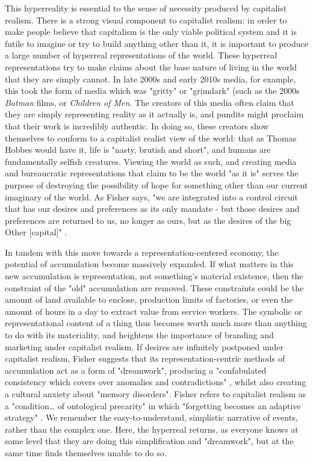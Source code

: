 This hyperreality is essential to the sense of necessity produced by capitalist realism. There is a strong visual component to capitalist realism: in order to make people believe that capitalism is the only viable political system and it is futile to imagine or try to build anything other than it, it is important to produce a large number of hyperreal representations of the world. These hyperreal representations try to make claims about the base nature of living in the world that they are simply cannot. In late 2000s and early 2010s media, for example, this took the form of media which was "gritty" or "grimdark" (such as the 2000s \textit{Batman} films, or \emph{Children of Men}. The creators of this media often claim that they are simply representing reality as it actually is, and pundits might proclaim that their work is incredibly authentic. In doing so, these creators show themselves to conform to a capitalist realist view of the world: that as Thomas Hobbes would have it, life is "nasty, brutish and short", and humans are fundamentally selfish creatures. Viewing the world as such, and creating media and bureaucratic representations that claim to be the world "as it is" serves the purpose of destroying the possibility of hope for something other than our current imaginary of the world. As Fisher says, "we are integrated into a control circuit that has our desires and preferences as its only mandate - but those desires and preferences are returned to us, no longer as ours, but as the desires of the big Other [capital]" \citep[53]{fisher_capitalist_2009}.

In tandem with this move towards a representation-centered economy, the potential  of accumulation become massively expanded. If what matters in this new accumulation is representation, not something's material existence, then the constraint of the "old" accumulation are removed. These constraints could be the amount of land available to enclose, production limits of factories, or even the amount of hours in a day to extract value from service workers. The symbolic or representational content of a thing thus becomes worth much more than anything to do with its materiality, and heightens the importance of branding and marketing under capitalist realism. 
If desires are infinitely postponed under capitalist realism, Fisher suggests that its representation-centric methods of accumulation act as a form of "dreamwork", producing a "confabulated consistency which covers over anomalies and contradictions" \citep[64]{fisher_capitalist_2009}, whilst also creating a cultural anxiety about "memory disorders". Fisher refers to capitalist realism as a "condition\ldots{} of ontological precarity" in which "forgetting becomes an adaptive strategy" \citep[60]{fisher_capitalist_2009}. We remember the easy-to-understand, simplistic narrative of events, rather than the complex one.  Here, the hyperreal returns, as everyone knows at some level that they are doing this simplification and "dreamwork", but at the same time finds themselves unable to do so.

